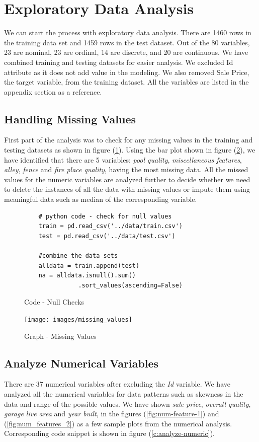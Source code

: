 \documentclass[sigconf]{acmart}
\begin{document}
	\section{Exploratory Data Analysis} 
		
	We can start the process with exploratory data analysis. There are 1460 rows in the training data set and 1459 rows in the test dataset. Out of the 80 variables, 23 are nominal, 23 are ordinal, 14 are discrete, and 20 are continuous. We have combined training and testing datasets for easier analysis. We excluded Id attribute as it does not add value in the modeling. We also removed Sale Price, the target variable, from the training dataset. All the variables are listed in the appendix section as a reference.
	
	\subsection{Handling Missing Values}
	
	First part of the analysis was to check for any missing values in the training and testing datasets as shown in figure (\ref{c:check-nulls}). Using the bar plot shown in figure (\ref{fig:missing-values}), we have identified that there are 5 variables: {\em pool quality}, {\em miscellaneous features}, {\em alley}, {\em fence} and {\em fire place quality}, having the most missing data. All the missed values for the numeric variables are analyzed further to decide whether we need to delete the instances of all the data with missing values or impute them using meaningful data such as median of the corresponding variable. 
	
	\begin{figure}[htb]
	\begin{verbatim}		
	# python code - check for null values
	train = pd.read_csv('../data/train.csv')
	test = pd.read_csv('../data/test.csv')
		
	#combine the data sets
	alldata = train.append(test)	
	na = alldata.isnull().sum()
	           .sort_values(ascending=False)
	\end{verbatim}
	\caption{Code - Null Checks}\label{c:check-nulls}
	\end{figure}
	
	\begin{figure}[htb]
		\centering
		\texttt{[image: images/missing\_values]}	
		\caption{Graph - Missing Values} \label{fig:missing-values} 
	\end{figure}

	\subsection{Analyze Numerical Variables}
	There are 37 numerical variables after excluding the {\em Id} variable. We have analyzed all the numerical variables for data patterns such as skewness in the data and range of the possible values. We have shown {\em sale price}, {\em overall quality}, {\em garage live area} and {\em year built}, in the figures (\ref{fig:num-feature-1}) and (\ref{fig:num_features_2}) as a few sample plots from the numerical analysis. Corresponding code snippet is shown in figure (\ref{c:analyze-numeric}).
	
\end{document}
